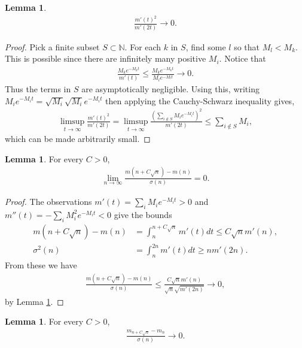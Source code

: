 \documentclass[12pt]{article}
\theoremstyle{definition}
\newtheorem{lemma}[proposition]{Lemma}
\begin{document}
\begin{lemma} \label{lem: D-4}
    \begin{align*}
        \frac{m'(t)^2}{m'(2t)} \rightarrow 0.
    \end{align*}
\end{lemma}
\begin{proof}
    Pick a finite subset $S \subset \mathbb{N}$. For each $k$ in $S$, find some $l$ so that $M_l < M_k$. This is possible since there are infinitely many positive $M_i$. Notice that
    \begin{align*}
        \frac{M_ke^{-M_kt}}{m'(t)} \leq \frac{M_ke^{-M_kt}}{M_le^{-M_lt}} \rightarrow 0.
    \end{align*}
    Thus the terms in $S$ are asymptotically negligible. Using this, writing $M_ie^{-M_it} = \sqrt{M_i}\sqrt{M_i}e^{-M_it}$ then applying the Cauchy-Schwarz inequality gives,
    \begin{align*}
        \limsup_{t \rightarrow \infty} \frac{m'(t)^2}{m'(2t)} = \limsup_{t \rightarrow \infty} \frac{(\sum_{i \notin S}M_ie^{-M_it})^2}{m'(2t)} \leq \sum_{i \notin S} M_i,
    \end{align*} which can be made arbitrarily small.
\end{proof}
\begin{lemma}\label{lem: D-3}
    For every $C>0$,
\begin{align*}
    \lim_{n \rightarrow \infty} \frac{m(n+C\sqrt{n})-m(n)}{\sigma(n)} = 0.
\end{align*}
\end{lemma}
\begin{proof} The observations $m'(t) = \sum_i M_i e^{-M_it} > 0$ and $m''(t) = -\sum_i M_i^2 e^{-M_it} < 0$ give the bounds
    \begin{align*}
        m(n+C\sqrt{n})-m(n) &= \int_n^{n+C\sqrt{n}}m'(t)dt \leq C \sqrt{n} m'(n), \\
        \sigma^2(n) &= \int_n^{2n}m'(t)dt \geq nm'(2n).
    \end{align*}
From these we have
\begin{align*}
    \frac{m(n+C\sqrt{n})-m(n)}{\sigma(n)} \leq \frac{C \sqrt{n}m'(n)}{\sqrt{n}\sqrt{m'(2n)}} \rightarrow 0,
\end{align*} by Lemma \ref{lem: D-4}.
\end{proof}
\begin{lemma} \label{lem: D-5}
    For every $C > 0$,
    \begin{align*}
        \frac{m_{n+C\sqrt{n}}-m_n}{\sigma(n)} \rightarrow 0.
    \end{align*}
\end{lemma}
\end{document}
